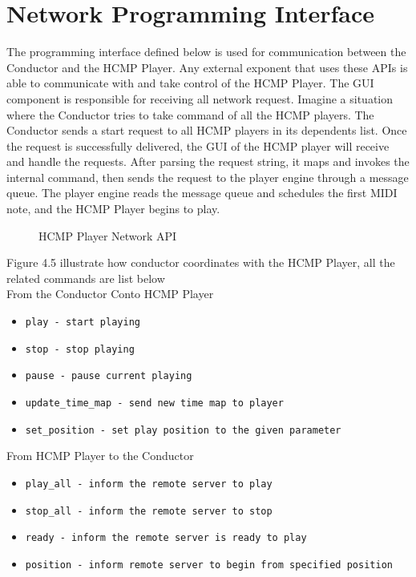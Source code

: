 \section{Network Programming Interface}
The programming interface defined below is used for communication 
between the Conductor and the HCMP Player. Any external exponent that  
uses these APIs is able to communicate with and take control of the 
HCMP Player. The GUI component is responsible for receiving all 
network request. Imagine a situation where the Conductor 
tries to take command of all the HCMP players. The Conductor sends a start
request to all HCMP players in its dependents list.
Once the request is successfully delivered, the GUI of the HCMP player will 
receive and handle the requests. After parsing the request string, 
it maps and invokes the internal command, then sends the request to the player 
engine through a message queue. The player engine reads the message queue and
schedules the first MIDI note, and the HCMP Player begins to play.

\begin{figure}[H]
\caption{HCMP Player Network API \cite{Dawen:2011}}
\end{figure}
Figure 4.5 illustrate how conductor coordinates with the HCMP Player, all the  
related commands are list below \\

From the Conductor Conto HCMP Player
\begin{itemize}
  \item \texttt{play - start playing}  
  \item \texttt{stop - stop playing}
  \item \texttt{pause - pause current playing}
  \item \texttt{update\_time\_map - send new time map to player}  
  \item \texttt{set\_position - set play position to the given parameter}
\end{itemize}

From HCMP Player to the Conductor 
\begin{itemize}
  \item \texttt{play\_all - inform the remote server to play}  
  \item \texttt{stop\_all - inform the remote server to stop}  
  \item \texttt{ready - inform the remote server is ready to play}
  \item \texttt{position - inform remote server to begin from specified position}
\end{itemize}
